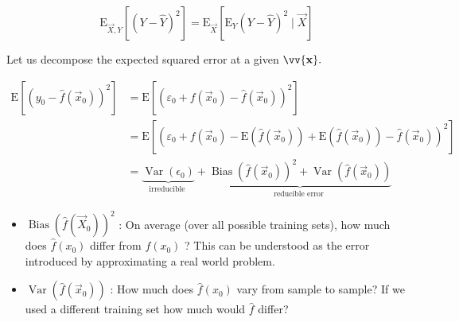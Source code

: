 \documentclass{report}
\begin{document}
$$\mathrm{E}_{\vec{X}, Y}\left[(Y-\hat{Y})^2\right]=\mathrm{E}_{\vec{X}}\left[\mathrm{E}_Y(Y-\hat{Y})^2 \mid \vec{X}\right]$$

\pagebreak


Let us decompose the expected squared error at a given $\vv{\mathbf{x}}.$
\bigskip

$\begin{aligned} \mathrm{E}\left[\left(y_0-\hat{f}\left(\vec{x}_0\right)\right)^2\right] & =\mathrm{E}\left[\left(\varepsilon_0+f\left(\vec{x}_0\right)-\hat{f}\left(\vec{x}_0\right)\right)^2\right] \\ & =\mathrm{E}\left[\left(\varepsilon_0+f\left(\vec{x}_0\right)-\mathrm{E}\left(\hat{f}\left(\vec{x}_0\right)\right)+\mathrm{E}\left(\hat{f}\left(\vec{x}_0\right)\right)-\hat{f}\left(\vec{x}_0\right)\right)^2\right] \\ & =\underbrace{\operatorname{Var}\left(\epsilon_0\right)}_{\text {irreducible }}+\underbrace{\operatorname{Bias}\left(\hat{f}\left(\vec{x}_0\right)\right)^2+\operatorname{Var}\left(\hat{f}\left(\vec{x}_0\right)\right)}_{\text {reducible error }}\end{aligned}$


\begin{itemize}
  \item $\operatorname{Bias}\left(\hat{f}\left(\vec{X}_0\right)\right)^2$ : On average (over all possible training sets), how much does $\hat{f}\left(x_0\right)$ differ from $f\left(x_0\right)$ ? This can be understood as the error introduced by approximating a real world problem.

  \item $\operatorname{Var}\left(\hat{f}\left(\vec{x}_0\right)\right)$ : How much does $\hat{f}\left(x_0\right)$ vary from sample to sample? If we used a different training set how much would $\hat{f}$ differ?
\end{itemize}
\end{document}
